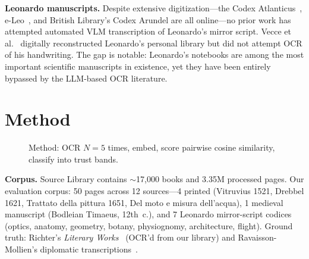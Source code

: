 \documentclass[10pt,twocolumn]{article}
\begin{document}
\textbf{Leonardo manuscripts.} Despite extensive digitization---the Codex Atlanticus~\cite{codexatlanticus}, e-Leo~\cite{eleo}, and British Library's Codex Arundel are all online---no prior work has attempted automated VLM transcription of Leonardo's mirror script. Vecce et al.~\cite{vecce2022} digitally reconstructed Leonardo's personal library but did not attempt OCR of his handwriting. The gap is notable: Leonardo's notebooks are among the most important scientific manuscripts in existence, yet they have been entirely bypassed by the LLM-based OCR literature.

\section{Method}

\begin{figure}[H]
\centering
{}
\caption{Method: OCR $N{=}5$ times, embed, score pairwise cosine similarity, classify into trust bands.}
\label{fig:method}
\end{figure}

\textbf{Corpus.} Source Library contains ${\sim}$17,000 books and 3.35M processed pages. Our evaluation corpus: 50 pages across 12 sources---4 printed (Vitruvius 1521, Drebbel 1621, Trattato della pittura 1651, Del moto e misura dell'acqua), 1 medieval manuscript (Bodleian Timaeus, 12th~c.), and 7 Leonardo mirror-script codices (optics, anatomy, geometry, botany, physiognomy, architecture, flight). Ground truth: Richter's \emph{Literary Works}~\cite{richter1883} (OCR'd from our library) and Ravaisson-Mollien's diplomatic transcriptions~\cite{ravaisson1881}.
\end{document}
